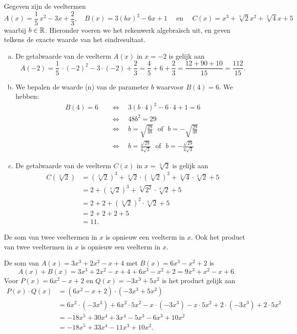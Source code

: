 \documentclass{ximera}
\begin{document}
\begin{voorbeeld}
Gegeven zijn de veeltermen
\[
A(x) = \frac{1}{5}\,x^2-3x+\frac{2}{3}, \quad B(x) = 3(bx)^2-6x+1 \quad \text{ en } \quad C(x) = x^3 + \sqrt[3]{2} x^2 + \sqrt[3]{4}x+5
\]
waarbij $b \in \mathbb{R}$. Hieronder voeren we het rekenwerk algebra\"isch uit, en geven telkens de exacte waarde van het eindresultaat. 
\begin{enumerate}[(a)]
\item
De getalwaarde van de veelterm $A(x)$ in $x = -2$ is gelijk aan
\[
A(-2) = \frac{1}{5}\,\cdot (-2)^2-3\cdot(-2)+\frac{2}{3} = \frac{4}{5} +6+ \frac{2}{3} = \frac{12 + 90 + 10}{15} = \frac{112}{15}.
\]
\item
We bepalen de waarde (n) van de parameter $b$ waarvoor $B(4) = 6$. We hebben:
\begin{align*}
B(4) = 6 \quad 
& \Leftrightarrow \quad 3(b\cdot 4)^2-6\cdot 4+1 = 6 \\ 
& \Leftrightarrow \quad 48b^2 = 29 \\
& \Leftrightarrow \quad b = \sqrt{\frac{29}{48}} \,\,\text{ of }\,\, b = - \sqrt{\frac{29}{48}} \\
& \Leftrightarrow \quad b = \frac{\sqrt{29}}{4\sqrt{3}} \,\,\text{ of }\,\, b = - \frac{\sqrt{29}}{4\sqrt{3}}
\end{align*}
\item
De getalwaarde van de veelterm $C(x)$ in $x = \sqrt[3]{2}$ is gelijk aan
\begin{align*}
C(\sqrt[3]{2}) & = (\sqrt[3]{2})^3 + \sqrt[3]{2}\cdot(\sqrt[3]{2})^2 + \sqrt[3]{4}\cdot \sqrt[3]{2}+5 \\
& = 2 + (\sqrt[3]{2})^3 + \sqrt[3]{2^2}\cdot \sqrt[3]{2} + 5 \\
& = 2 + 2 + (\sqrt[3]{2})^2 \cdot \sqrt[3]{2} + 5 \\
& = 2 + 2 + 2 + 5 \\
& = 11.
\end{align*}
\end{enumerate}
\end{voorbeeld}

De som van twee veeltermen in $x$ is opnieuw een veelterm in $x$. Ook het product van twee veeltermen in $x$ is opnieuw een veelterm in $x$. 

\begin{voorbeeld}
De som van $A(x) = 3x^3+2x^2-x+4$ met $B(x) = 6x^3-x^2+2$ is 
\[
A(x) + B(x) = 3x^3+2x^2-x+4 + 6x^3-x^2+2 = 9x^3 + x^2 - x + 6.
\]
Voor $P(x) = 6x^2-x+2$ en $Q(x) = -3x^3+5x^2$ is het product gelijk aan
\begin{align*}
P(x) \cdot Q(x) 
& = (6x^2-x+2) \cdot (-3x^3+5x^2) \\
& = 6x^2 \cdot (-3x^3) + 6x^2\cdot 5x^2 - x \cdot(-3x^3) - x \cdot 5x^2 + 2 \cdot(-3x^3) + 2 \cdot 5x^2 \\
& = -18x^5 + 30x^4 + 3x^4 - 5x^3 - 6x^3 + 10x^2 \\
& = -18x^5 + 33x^4 - 11x^3 + 10x^2.
\end{align*}
\end{voorbeeld}
\end{document}
